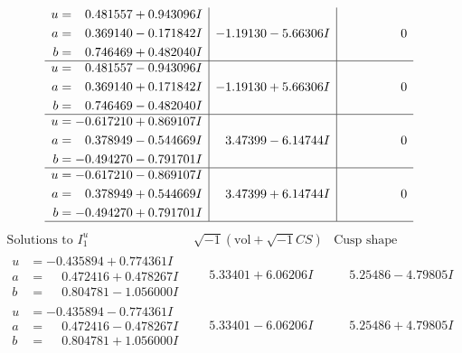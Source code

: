 \documentclass[1p]{elsarticle_modified}
\theoremstyle{definition}
\newcommand{\I}{\sqrt{-1}}
\begin{document}
$$\begin{array}{c|c|c}
\begin{aligned}
u &= \phantom{-}0.481557 + 0.943096 I \\
a &= \phantom{-}0.369140 - 0.171842 I \\
b &= \phantom{-}0.746469 + 0.482040 I\end{aligned}
 & -1.19130 - 5.66306 I & \phantom{-0.000000 } 0 \\ \hline\begin{aligned}
u &= \phantom{-}0.481557 - 0.943096 I \\
a &= \phantom{-}0.369140 + 0.171842 I \\
b &= \phantom{-}0.746469 - 0.482040 I\end{aligned}
 & -1.19130 + 5.66306 I & \phantom{-0.000000 } 0 \\ \hline\begin{aligned}
u &= -0.617210 + 0.869107 I \\
a &= \phantom{-}0.378949 - 0.544669 I \\
b &= -0.494270 - 0.791701 I\end{aligned}
 & \phantom{-}3.47399 - 6.14744 I & \phantom{-0.000000 } 0 \\ \hline\begin{aligned}
u &= -0.617210 - 0.869107 I \\
a &= \phantom{-}0.378949 + 0.544669 I \\
b &= -0.494270 + 0.791701 I\end{aligned}
 & \phantom{-}3.47399 + 6.14744 I & \phantom{-0.000000 } 0\\
 \hline 
 \end{array}$$\newpage$$\begin{array}{c|c|c}  
\text{Solutions to }I^u_{1}& \I (\text{vol} + \sqrt{-1}CS) & \text{Cusp shape}\\
 \hline 
\begin{aligned}
u &= -0.435894 + 0.774361 I \\
a &= \phantom{-}0.472416 + 0.478267 I \\
b &= \phantom{-}0.804781 - 1.056000 I\end{aligned}
 & \phantom{-}5.33401 + 6.06206 I & \phantom{-}5.25486 - 4.79805 I \\ \hline\begin{aligned}
u &= -0.435894 - 0.774361 I \\
a &= \phantom{-}0.472416 - 0.478267 I \\
b &= \phantom{-}0.804781 + 1.056000 I\end{aligned}
 & \phantom{-}5.33401 - 6.06206 I & \phantom{-}5.25486 + 4.79805 I \\ \hline\begin{aligned}

\end{aligned}
\end{array}$$
\end{document}
